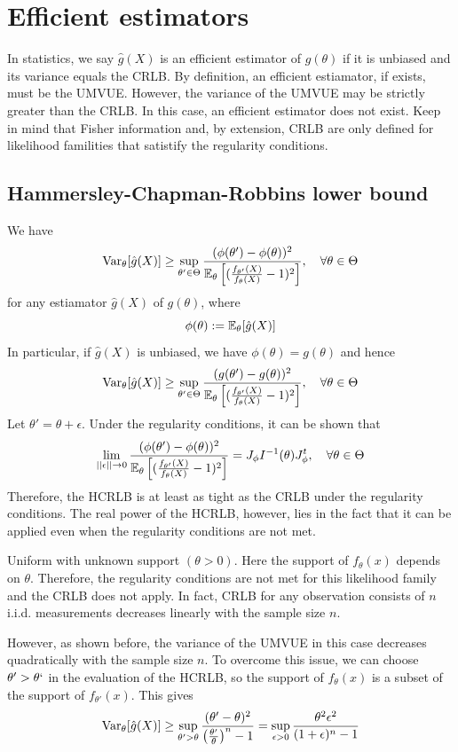 \documentclass[11pt]{book}
\begin{document}
  \section{Efficient estimators}
  In statistics, we say $\hat{g}(X)$ is an efficient estimator of $g(\theta)$ if it is unbiased and its variance equals the CRLB. By definition, an efficient estiamator, if exists, must be the UMVUE. However, the variance of the UMVUE may be strictly greater than the CRLB. In this case, an efficient estimator does not exist. Keep in mind that Fisher information and, by extension, CRLB are only defined for likelihood familities that satistify the regularity conditions.
  \subsection{Hammersley-Chapman-Robbins lower bound}
  We have 
  \[
    \operatorname{Var}_\theta[\hat{g}(X)] \geq \sup_{\theta' \in \Theta} \frac{(\phi(\theta')-\phi(\theta))^2}{\mathbb{E}_\theta\left[ (\frac{f_{\theta'}(X)}{f_\theta(X)} - 1)^2\right]}, \quad \forall\theta\in\Theta
  \] 
  for any estiamator $\hat{g}(X)$ of $g(\theta)$, where 
  \[
    \phi(\theta) := \mathbb{E}_\theta[\hat{g}(X)]
  \] 
  In particular, if $\hat{g}(X)$ is unbiased, we have $\phi(\theta) = g(\theta)$ and hence 
  \[ 
    \operatorname{Var}_\theta[\hat{g}(X)] \geq \sup_{\theta' \in \Theta} \frac{(g(\theta') - g(\theta))^2}{\mathbb{E}_\theta \left[(\frac{f_{\theta'}(X)}{f_\theta(X)}-1)^2 \right]}, \quad \forall\theta\in\Theta 
  \]
  Let $\theta' = \theta + \epsilon$. Under the regularity conditions, it can be shown that 
  \[ 
    \lim_{||\epsilon|| \to 0} \frac{(\phi(\theta') - \phi(\theta))^2}{\mathbb{E}_\theta \left[(\frac{f_{\theta'}(X)}{f_\theta(X)}-1)^2 \right]} = J_\phi I^{-1} (\theta) J_\phi^t, \quad \forall\theta\in\Theta 
  \]
  Therefore, the HCRLB is at least as tight as the CRLB under the regularity conditions. The real power of the HCRLB, however, lies in the fact that it can be applied even when the regularity conditions are not met.
  
\begin{exmp}
  Uniform with unknown support $(\theta > 0)$. Here the support of $f_\theta(x)$ depends on $\theta$. Therefore, the regularity 
  conditions are not met for this likelihood family and the CRLB does not apply. In fact, CRLB for any observation consists of $n$ i.i.d. measurements decreases linearly 
  with the sample size $n$. 

  However, as shown before, the variance of the UMVUE in this case decreases 
  quadratically with the sample size $n$. To overcome this issue, we can choose $\theta' > \theta`$
  in the evaluation of the HCRLB, so the support of $f_\theta(x)$ is a subset of the support of $f_{\theta'}(x)$. This gives 
  \[
    \operatorname{Var}_\theta[\hat{g}(X)] \geq \sup_{\theta' > \theta} \frac{(\theta' - \theta)^2}{\left( \frac{\theta'}{\theta} \right)^n - 1} = \sup_{\epsilon > 0} \frac{\theta^2\epsilon^2}{(1+\epsilon)^n - 1}
  \]
\end{exmp}
\end{document}
